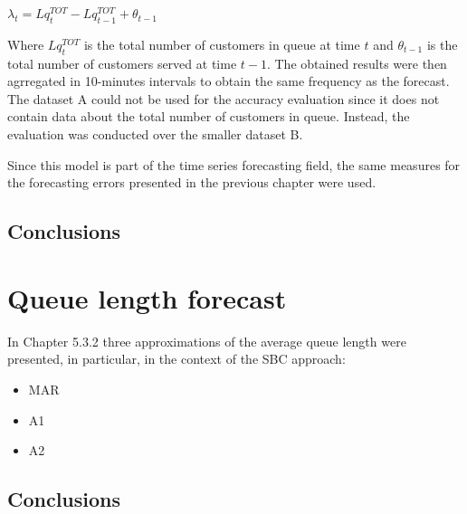 $ \lambda_t = Lq_t^{TOT} - Lq_{t-1}^{TOT} + \theta_{t-1} $

Where $ Lq_t^{TOT} $ is the total number of customers in queue at time $ t $ and $ \theta_{t-1} $ is the total number of customers served at time $ t-1 $. The obtained results were then agrregated in 10-minutes intervals to obtain the same frequency as the forecast. The dataset A could not be used for the accuracy evaluation since it does not contain data about the total number of customers in queue. Instead, the evaluation was conducted over the smaller dataset B.

Since this model is part of the time series forecasting field, the same measures for the forecasting errors presented in the previous chapter were used.

\subsection{Conclusions}
\label{subsec:conclusions}

\section{Queue length forecast}
\label{sec:queue_length_forecast}
In Chapter 5.3.2 three approximations of the average queue length were presented, in particular, in the context of the SBC approach:
\begin{itemize}
  \item MAR
  \item A1
  \item A2
\end{itemize}

\subsection{Conclusions}
\label{subsec:conclusions}

\clearpage

